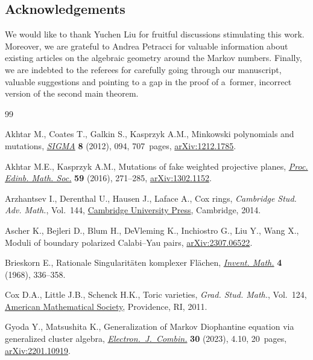 \documentclass[pdftex]{sigma}
\theoremstyle{definition}
\begin{document}
\subsection*{Acknowledgements}

We would like to thank Yuchen Liu for fruitful
discussions stimulating this work.
Moreover, we are grateful to Andrea Petracci for
valuable information about existing articles on
the algebraic geometry around the Markov numbers.
Finally, we are indebted to the referees for
carefully going through our manuscript, valuable
suggestions and pointing to a gap in the proof of
a~former, incorrect version of the second main
theorem.


\begin{thebibliography}{99}
\footnotesize\itemsep=0pt

Akhtar M., Coates T., Galkin S., Kasprzyk A.M., Minkowski polynomials and
 mutations, \href{https://doi.org/10.3842/SIGMA.2012.094}{\textit{SIGMA}}
 \textbf{8} (2012), 094, 707~pages,
 \href{http://arxiv.org/abs/1212.1785}{arXiv:1212.1785}.

Akhtar M.E., Kasprzyk A.M., Mutations of fake weighted projective planes,
 \href{https://doi.org/10.1017/S0013091515000115}{\textit{Proc. Edinb. Math.
 Soc.}} \textbf{59} (2016), 271--285,
 \href{http://arxiv.org/abs/1302.1152}{arXiv:1302.1152}.

Arzhantsev I., Derenthal U., Hausen J., Laface A., Cox rings, \textit{Cambridge
 Stud. Adv. Math.}, Vol.~144,
 \href{https://doi.org/10.1017/CBO9781139175852}{Cambridge University Press}, Cambridge, 2014.

Ascher K., Bejleri D., Blum H., DeVleming K., Inchiostro G., Liu Y., Wang X.,
 Moduli of boundary polarized {C}alabi--{Y}au pairs,
 \href{http://arxiv.org/abs/2307.06522}{arXiv:2307.06522}.

Brieskorn E., Rationale {S}ingularit\"aten komplexer {F}l\"achen,
 \href{https://doi.org/10.1007/BF01425318}{\textit{Invent. Math.}} \textbf{4}
 (1968), 336--358.

Cox D.A., Little J.B., Schenck H.K., Toric varieties, \textit{Grad. Stud.
 Math.}, Vol.~124, \href{https://doi.org/10.1090/gsm/124}{American
 Mathematical Society}, Providence, RI, 2011.

Gyoda Y., Matsushita K., Generalization of {M}arkov {D}iophantine equation via
 generalized cluster algebra,
 \href{https://doi.org/10.37236/11420}{\textit{Electron.~J.~Combin.}}
 \textbf{30} (2023), 4.10, 20~pages,
 \href{http://arxiv.org/abs/2201.10919}{arXiv:2201.10919}.


\end{thebibliography}
\end{document}
